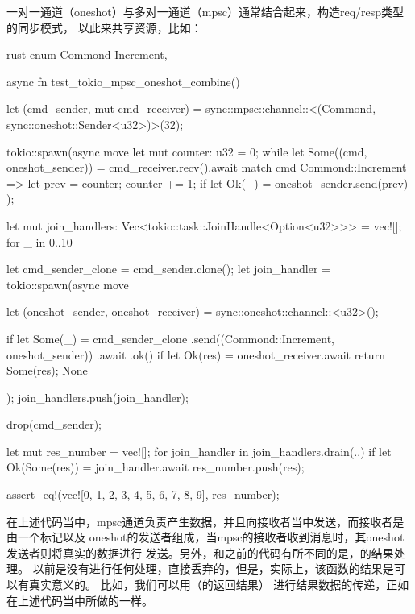 一对一通道（oneshot）与多对一通道（mpsc）通常结合起来，构造req/resp类型的同步模式，
以此来共享资源，比如：
\begin{code-block}{rust}
enum Commond {
    Increment,
}

async fn test_tokio_mpsc_oneshot_combine() {
    let (cmd_sender, mut cmd_receiver) =
        sync::mpsc::channel::<(Commond, sync::oneshot::Sender<u32>)>(32);

    tokio::spawn(async move {
        let mut counter: u32 = 0;
        while let Some((cmd, oneshot_sender)) = cmd_receiver.recv().await {
            match cmd {
                Commond::Increment => {
                    let prev = counter;
                    counter += 1;
                    if let Ok(_) = oneshot_sender.send(prev) {}
                }
            }
        }
    });

    let mut join_handlers: Vec<tokio::task::JoinHandle<Option<u32>>> = vec![];
    for _ in 0..10 {
        let cmd_sender_clone = cmd_sender.clone();
        let join_handler = tokio::spawn(async move {
            let (oneshot_sender, oneshot_receiver) =
                sync::oneshot::channel::<u32>();

            if let Some(_) = cmd_sender_clone
                .send((Commond::Increment, oneshot_sender))
                .await
                .ok()
            {
                if let Ok(res) = oneshot_receiver.await {
                    return Some(res);
                }
            }
            None
        });
        join_handlers.push(join_handler);
    }

    drop(cmd_sender);

    let mut res_number = vec![];
    for join_handler in join_handlers.drain(..) {
        if let Ok(Some(res)) = join_handler.await {
            res_number.push(res);
        }
    }

    assert_eq!(vec![0, 1, 2, 3, 4, 5, 6, 7, 8, 9], res_number);
}
\end{code-block}
在上述代码当中，mpsc通道负责产生数据，并且向接收者当中发送，而接收者是由一个标记以及
oneshot的发送者组成，当mpsc的接收者收到消息时，其oneshot发送者则将真实的数据进行
发送。另外，和之前的代码有所不同的是，的结果处理。
以前是没有进行任何处理，直接丢弃的，但是，实际上，该函数的结果是可以有真实意义的。
比如，我们可以用（的返回结果）
进行结果数据的传递，正如在上述代码当中所做的一样。

